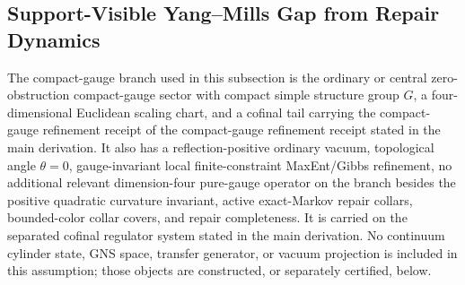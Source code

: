 \subsection{Support-Visible Yang--Mills Gap from Repair Dynamics}
\label{app:yang-mills-repair-gap}

\begin{assumption}
\label{ass:oph-yang-mills-branch}
The compact-gauge branch used in this subsection is the ordinary or central zero-obstruction
compact-gauge sector with compact simple structure group \(G\), a four-dimensional Euclidean
scaling chart, and a cofinal tail carrying the compact-gauge refinement receipt of
the compact-gauge refinement receipt stated in the main derivation. It also has a reflection-positive ordinary
vacuum, topological angle \(\theta=0\), gauge-invariant
local finite-constraint MaxEnt/Gibbs refinement, no additional relevant dimension-four pure-gauge
operator on the branch besides the positive quadratic curvature invariant, active exact-Markov
repair collars, bounded-color collar covers, and repair completeness. It is carried on the
separated cofinal regulator system stated in the main derivation. No continuum
cylinder state, GNS space, transfer generator, or vacuum projection is included in this
assumption; those objects are constructed, or separately certified, below.
\end{assumption}

